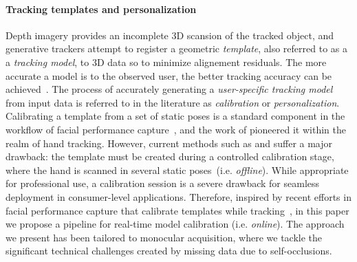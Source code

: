 \paragraph{Tracking templates and personalization}
Depth imagery provides an incomplete 3D scansion of the tracked object, and generative trackers attempt to register a geometric \emph{template}, also referred to as a a \emph{tracking model}, to 3D data so to minimize alignement residuals.
The more accurate a model is to the observed user, the better tracking accuracy can be achieved~\cite{tkach2016sphere,taylor2016joint}. The process of accurately generating a \emph{user-specific tracking model} from input data is referred to in the literature as \emph{calibration} or \emph{personalization}. 
Calibrating a template from a set of static poses is a standard component in the workflow of facial performance capture~\cite{weise2011realtime,cao2015facial}, and the work of  \cite{taylor2014user} pioneered it within the realm of hand tracking. However, current methods such as \cite{taylor2016joint} and \cite{tkach2016sphere} suffer a major drawback: the template must be created during a controlled calibration stage, where the hand is scanned in several static poses~(i.e. \emph{offline}). While appropriate for professional use, a calibration session is a severe drawback for seamless deployment in consumer-level applications.
Therefore, inspired by recent efforts in facial performance capture that calibrate templates while tracking~\cite{li_sig13,bouaziz2013online}, in this paper we propose a pipeline for real-time model calibration (i.e. \emph{online}). The approach we present has been tailored to monocular acquisition, where we tackle the significant technical challenges created by missing data due to self-occlusions.

